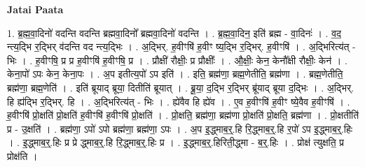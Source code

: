 \documentclass[17pt]{extarticle}
\begin{document}
\textbf{Jatai Paata} \newline

1. ब्र॒ह्म॒वा॒दिनो॑ वदन्ति वदन्ति ब्रह्मवा॒दिनो᳚ ब्रह्मवा॒दिनो॑ वदन्ति । . ब्र॒ह्म॒वा॒दिन॒ इति॑ ब्रह्म - वा॒दिनः॑ । . व॒द॒ न्त्य॒द्भि र॒द्भिर् व॑दन्ति वद न्त्य॒द्भिः । . अ॒द्भिर्. ह॒वीꣳषि॑ ह॒वीꣳ ष्य॒द्भि र॒द्भिर्. ह॒वीꣳषि॑ । . अ॒द्भिरित्य॑त् - भिः । . ह॒वीꣳषि॒ प्र प्र ह॒वीꣳषि॑ ह॒वीꣳषि॒ प्र । . प्रौक्षी॑ रौक्षीः॒ प्र प्रौक्षीः᳚ । . औ॒क्षीः॒ केन॒ केनौ᳚क्षी रौक्षीः॒ केन॑ । . केना॒पो॑ ऽपः केन॒ केना॒पः । . अ॒प इतीत्य॒पो॑ ऽप इति॑ । . इति॒ ब्रह्म॑णा॒ ब्रह्म॒णेतीति॒ ब्रह्म॑णा । . ब्रह्म॒णेतीति॒ ब्रह्म॑णा॒ ब्रह्म॒णेति॑ । . इति॑ ब्रूयाद् ब्रूया॒ दितीति॑ ब्रूयात् । . ब्रू॒या॒ द॒द्भि र॒द्भिर् ब्रू॑याद् ब्रूया द॒द्भिः । . अ॒द्भिर्. हि ह्य॑द्भि र॒द्भिर्. हि । . अ॒द्भिरित्य॑त् - भिः । . ह्ये॑वैव हि ह्ये॑व । . ए॒व ह॒वीꣳषि॑ ह॒वीꣳ ष्ये॒वैव ह॒वीꣳषि॑ । . ह॒वीꣳषि॑ प्रो॒क्षति॑ प्रो॒क्षति॑ ह॒वीꣳषि॑ ह॒वीꣳषि॑ प्रो॒क्षति॑ । . प्रो॒क्षति॒ ब्रह्म॑णा॒ ब्रह्म॑णा प्रो॒क्षति॑ प्रो॒क्षति॒ ब्रह्म॑णा । . प्रो॒क्षतीति॑ प्र - उ॒क्षति॑ । . ब्रह्म॑णा॒ ऽपो॑ ऽपो ब्रह्म॑णा॒ ब्रह्म॑णा॒ ऽपः । . अ॒प इ॒द्ध्माब॒र्॒.हि रि॒द्ध्माब॒र्॒.हि र॒पो॑ ऽप इ॒द्ध्माब॒र्॒.हिः । . इ॒द्ध्माब॒र्॒.हिः प्र प्रे द्ध्माब॒र्॒.हि रि॒द्ध्माब॒र्॒.हिः प्र । . इ॒द्ध्माब॒र्॒.हिरिती॒द्ध्मा - ब॒र्॒.हिः । . प्रोक्ष॑ त्युक्षति॒ प्र प्रोक्ष॑ति । \newline
\end{document}
